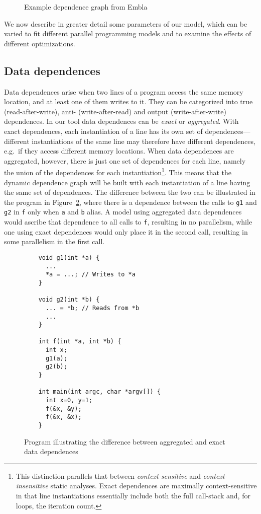 \begin{figure}
  \begin{center}
  \small
  
  \end{center}
  \nocaptionrule \caption{Example dependence graph from Embla}
  \label{example-depgraph}
\end{figure}

We now describe in greater detail some parameters of our model, which can be varied to fit different parallel programming models and to examine the effects of different optimizations.

\subsection{Data dependences}
Data dependences arise when two lines of a program access the same memory location, and at least one of them writes to it.
They can be categorized into true (read-after-write), anti- (write-after-read) and output (write-after-write) dependences.
In our tool data dependences can be \emph{exact} or \emph{aggregated}.
With exact dependences, each instantiation of a line has its own set of dependences---different instantiations of the same line may therefore have different dependences, e.g.\ if they access different memory locations.
When data dependences are aggregated, however, there is just one set of dependences for each line, namely the union of the dependences for each instantiation\footnote{
This distinction parallels that between {\em context-sensitive} and
{\em context-insensitive} static analyses.
Exact dependences are maximally context-sensitive in that line instantiations
essentially include both the full call-stack and, for loops, the iteration
count.}.
This means that the dynamic dependence graph will be built with each instantiation of a line having the same set of dependences.
The difference between the two can be illustrated in the program in Figure~\ref{datadeps}, where there is a dependence between the calls to \texttt{g1} and \texttt{g2} in \texttt{f} only when \texttt{a} and \texttt{b} alias.
A model using aggregated data dependences would ascribe that dependence to all calls to \texttt{f}, resulting in no parallelism, while one using exact dependences would only place it in the second call, resulting in some parallelism in the first call.

\begin{figure}
  \begin{center}
  \small
  \begin{verbatim}
    void g1(int *a) {
      ...
      *a = ...; // Writes to *a
    }
  
    void g2(int *b) {
      ... = *b; // Reads from *b
      ...
    }

    int f(int *a, int *b) {
      int x;
      g1(a);
      g2(b);
    }

    int main(int argc, char *argv[]) {
      int x=0, y=1;
      f(&x, &y);
      f(&x, &x);
    }
  \end{verbatim}
  \end{center}
  \caption{Program illustrating the difference between aggregated and exact data dependences}
  \label{datadeps}
\end{figure}

